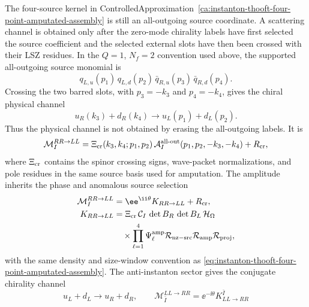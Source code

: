 \begin{controlledapproximation}
\label{ca:instanton-thooft-crossed-chiral-channel}
The four-source kernel in
ControlledApproximation~\ref{ca:instanton-thooft-four-point-amputated-assembly}
is still an all-outgoing source coordinate.  A scattering channel is obtained
only after the zero-mode chirality labels have first selected the source
coefficient and the selected external slots have then been crossed with their
LSZ residues.  In the \(Q=1\), \(N_f=2\) convention used above, the supported
all-outgoing source monomial is
\[
  q_{L,u}(p_1)\,q_{L,d}(p_2)\,
  \bar q_{R,u}(p_3)\,\bar q_{R,d}(p_4).
\]
Crossing the two barred slots, with \(p_3=-k_3\) and \(p_4=-k_4\), gives the
chiral physical channel
\begin{equation}
  u_R(k_3)+d_R(k_4)
  \longrightarrow
  u_L(p_1)+d_L(p_2).
  \label{eq:instanton-thooft-crossed-channel-process}
\end{equation}
Thus the physical channel is not obtained by erasing the all-outgoing labels.
It is
\begin{equation}
  \mathcal M_I^{R R\to L L}
  =
  \Xi_{\rm cr}(k_3,k_4;p_1,p_2)\,
  \mathcal A_{I}^{\rm all\text{-}out}
       (p_1,p_2,-k_3,-k_4)
  +R_{\rm cr},
  \label{eq:instanton-thooft-crossed-channel-amplitude}
\end{equation}
where \(\Xi_{\rm cr}\) contains the spinor crossing signs, wave-packet
normalizations, and pole residues in the same source basis used for
amputation.  The amplitude inherits the phase and anomalous source selection
\begin{equation}
\begin{aligned}
  \mathcal M_I^{R R\to L L}
  &=
  \ee^{\ii\theta}K_{R R\to L L}+R_{\rm cr},
  \\
  K_{R R\to L L}
  &=
  \Xi_{\rm cr}\,
  \mathcal C_I\,
  \det B_R\,\det B_L\,
  \mathcal H_\Omega                                      \\
  &\quad{}\times
  \prod_{\ell=1}^{4}\Psi_\ell^{\rm amp}
  \mathcal R_{\rm nz-src}\mathcal R_{\rm amp}\mathcal R_{\rm proj},
  \label{eq:instanton-thooft-crossed-channel-kernel}
\end{aligned}
\end{equation}
with the same density and size-window convention as
\eqref{eq:instanton-thooft-four-point-amputated-assembly}.  The anti-instanton
sector gives the conjugate chirality channel
\[
  u_L+d_L\longrightarrow u_R+d_R,
  \qquad
  \mathcal M_{\bar I}^{L L\to R R}
  =
  \ee^{-\ii\theta}K_{L L\to R R}^{\bar I}
\]
\end{controlledapproximation}
